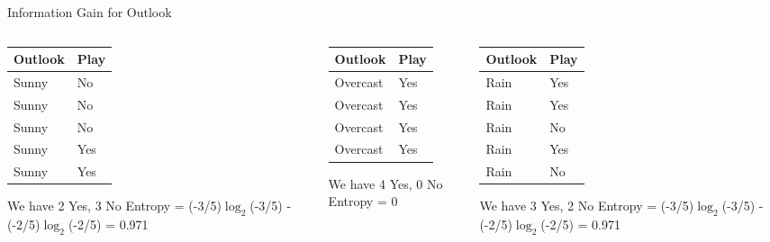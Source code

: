 \documentclass{beamer}
\begin{document}
\begin{frame}{Information Gain for Outlook}
\begin{columns}


\begin{column}{.32\textwidth}
	\begin{table}
\begin{tabular}{l|l} \toprule
	\textbf{Outlook} & \textbf{Play} \\ \midrule
	Sunny    & No   \\
	Sunny    & No   \\
	Sunny    & No   \\
	Sunny    & Yes  \\
	Sunny    & Yes  \\

\bottomrule
\end{tabular}
We have 2 Yes, 3 No
Entropy = (-3/5)$\log_{2}$(-3/5) - (-2/5)$\log_{2}$(-2/5) = 0.971
\end{table}
\end{column}

\pause \begin{column}{.32\textwidth}
	\begin{table}


\begin{tabular}{l|l} \toprule
	\textbf{Outlook} & \textbf{Play} \\ \midrule

	Overcast & Yes  \\
	Overcast & Yes  \\
	Overcast & Yes  \\
	Overcast & Yes  \\ \bottomrule

\end{tabular}
We have 4 Yes, 0 No
Entropy = 0


	\end{table}


\end{column}


\pause \begin{column}{.32\textwidth}
	\begin{table}
\begin{tabular}{l|l} \toprule
	\textbf{Outlook} & \textbf{Play} \\ \midrule
	Rain     & Yes  \\
	Rain     & Yes  \\
	Rain     & No   \\
	Rain     & Yes  \\
	Rain     & No  \\ \bottomrule
\end{tabular}
We have 3 Yes, 2 No
Entropy = (-3/5)$\log_{2}$(-3/5) - (-2/5)$\log_{2}$(-2/5) = 0.971
\end{table}
\end{column}
\end{columns}
\end{frame}
\end{document}
